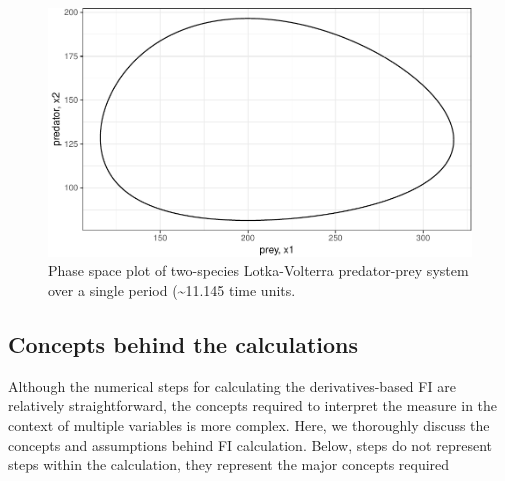 \documentclass[12pt,twoside,openany]{reedthesis}
\begin{document}
\begin{figure}
\centering
\includegraphics{_myDissertation_files/figure-latex/pp1Period-1.pdf}
\caption{\label{fig:pp1Period}Phase space plot of two-species Lotka-Volterra
predator-prey system over a single period (\textasciitilde{}11.145 time
units.}
\end{figure}
\subsection{Concepts behind the
calculations}\label{concepts-behind-the-calculations}

Although the numerical steps for calculating the derivatives-based FI
are relatively straightforward, the concepts required to interpret the
measure in the context of multiple variables is more complex. Here, we
thoroughly discuss the concepts and assumptions behind FI calculation.
Below, steps do not represent steps within the calculation, they
represent the major concepts required
\end{document}
